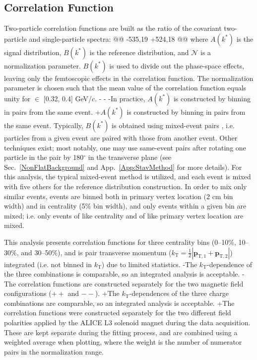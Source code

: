  \subsection{Correlation Function}
 \label{sec:CorrelationFunction}
 Two-particle correlation functions are built as the ratio of the covariant two-particle and single-particle spectra:
@@ -535,19 +524,18 @@
 where $A(k^{*})$ is the signal distribution, $B(k^{*})$ is the reference distribution, and $\mathcal{N}$ is a normalization parameter.  
 $B(k^{*})$ is used to divide out the phase-space effects, leaving only the femtoscopic effects in the correlation function. 
 The normalization parameter is chosen such that the mean value of the correlation function equals unity for \kstar $\in$ [0.32, 0.4] GeV/$c$.
-
-
-In practice, $A(k^{*})$ is constructed by binning in \kstar pairs from the same event.
+$A(k^{*})$ is constructed by binning in \kstar pairs from the same event.
 Typically, $B(k^{*})$ is obtained using mixed-event pairs \cite{Kopylov:1974th}, i.e. particles from a given event are paired with those from another event.
 Other techniques exist; most notably, one may use same-event pairs after rotating one particle in the pair by 180$^\circ$ in the transverse plane (see Sec.\ \ref{NonFlatBackground} and App.\ \ref{App:StavMethod} for more details).
 For this analysis, the typical mixed-event method is utilized, and each event is mixed with five others for the reference distribution construction.
 In order to mix only similar events, events are binned both in primary vertex location (2 cm bin width) and in centrality (5\% bin width), and only events within a given bin are mixed; i.e. only events of like centrality and of like primary vertex location are mixed.
 
 This analysis presents correlation functions for three centrality bins (0--10\%, 10--30\%, and 30--50\%), and is pair transverse momentum ($k_{\mathrm{T}} = \frac{1}{2}|\mathbf{p}_{\mathrm{T,1}}+\mathbf{p}_{\mathrm{T,2}}|$) integrated (i.e. not binned in $k_{\mathrm{T}}$) due to limited statistics.
-The $k_{\mathrm{T}}$-dependence of the three \LamK combinations is comparable, so an integrated analysis is acceptable.
-The correlation functions are constructed separately for the two magnetic field configurations ($++$ and $--$).
+The $k_{\mathrm{T}}$-dependences of the three \LamK charge combinations are comparable, so an integrated analysis is acceptable.
+The correlation functions were constructed separately for the two different field polarities applied by the ALICE L3 solenoid magnet during the data acquisition.
 These are kept separate during the fitting process, and are combined using a weighted average when plotting, where the weight is the number of numerator pairs in the normalization range.
 
